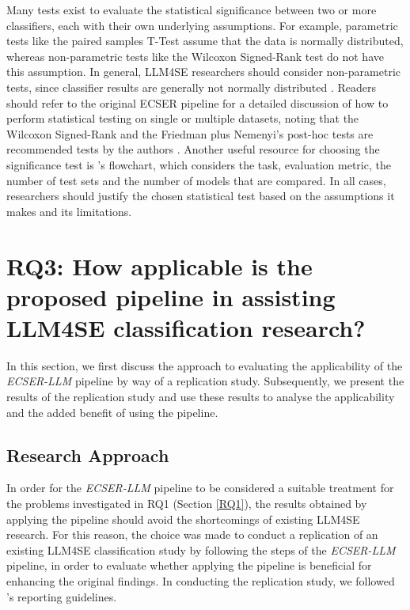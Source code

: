 \documentclass[a4paper]{article}
\newcommand{\newecser}{\textit{ECSER-LLM} }
\begin{document}
Many tests exist to evaluate the statistical significance between two or more classifiers, each with their own underlying assumptions. For example, parametric tests like the paired samples T-Test assume that the data is normally distributed, whereas non-parametric tests like the Wilcoxon Signed-Rank test do not have this assumption. In general, LLM4SE researchers should consider non-parametric tests, since classifier results are generally not normally distributed \cite{demsar2006statistical}. Readers should refer to the original ECSER pipeline for a detailed discussion of how to perform statistical testing on single or multiple datasets, noting that the Wilcoxon Signed-Rank and the Friedman plus Nemenyi's post-hoc tests are recommended tests by the authors \cite{Dellanna2022}. Another useful resource for choosing the significance test is \textcite{Rainio2024}'s flowchart, which considers the task, evaluation metric, the number of test sets and the number of models that are compared. In all cases, researchers should justify the chosen statistical test based on the assumptions it makes and its limitations. 

\section{RQ3: How applicable is the proposed pipeline in assisting LLM4SE classification research?}
\label{RQ3}
In this section, we first discuss the approach to evaluating the applicability of the \newecser pipeline by way of a replication study. Subsequently, we present the results of the replication study and use these results to analyse the applicability and the added benefit of using the pipeline.

\subsection{Research Approach}
In order for the \newecser pipeline to be considered a suitable treatment for the problems investigated in RQ1 (Section \ref{RQ1}), the results obtained by applying the pipeline should avoid the shortcomings of existing LLM4SE research. For this reason, the choice was made to conduct a replication of an existing LLM4SE classification study by following the steps of the \newecser pipeline, in order to evaluate whether applying the pipeline is beneficial for enhancing the original findings. In conducting the replication study, we followed \textcite{carver2010}'s reporting guidelines.
\end{document}
